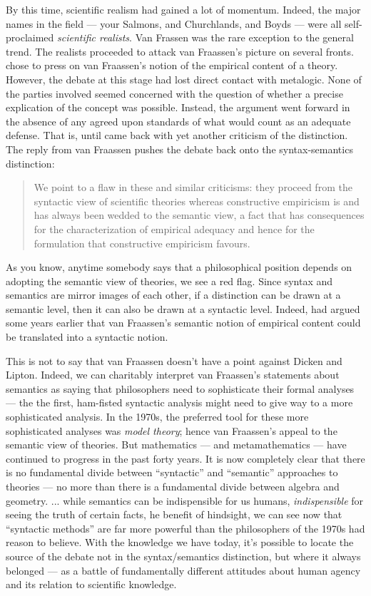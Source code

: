 By this time, scientific realism had gained a lot of momentum.
Indeed, the major names in the field --- your Salmons, and
Churchlands, and Boyds --- were all self-proclaimed {\it scientific
  realists}.  Van Frassen was the rare exception to the general trend.
The realists proceeded to attack van Fraassen's picture on several
fronts.  \cite{musgrave} chose to press on van Fraassen's notion of
the empirical content of a theory.  However, the debate at this stage
had lost direct contact with metalogic.  None of the parties involved
seemed concerned with the question of whether a precise explication of
the concept was possible.  Instead, the argument went forward in the
absence of any agreed upon standards of what would count as an
adequate defense.  That is, until \cite{dick} came back with yet
another criticism of the distinction.  The reply from van Fraassen
pushes the debate back onto the syntax-semantics distinction:
\begin{quote}
  We point to a flaw in these and similar criticisms: they proceed
  from the syntactic view of scientific theories whereas constructive
  empiricism is and has always been wedded to the semantic view, a
  fact that has consequences for the characterization of empirical
  adequacy and hence for the formulation that constructive empiricism
  favours. \citep{muller} \end{quote} As you know, anytime somebody
says that a philosophical position depends on adopting the semantic
view of theories, we see a red flag.  Since syntax and semantics are
mirror images of each other, if a distinction can be drawn at a
semantic level, then it can also be drawn at a syntactic level.
Indeed, \cite{turney} had argued some years earlier that van
Fraassen's semantic notion of empirical content could be translated
into a syntactic notion.

This is not to say that van Fraassen doesn't have a point against
Dicken and Lipton.  Indeed, we can charitably interpret van Fraassen's
statements about semantics as saying that philosophers need to
sophisticate their formal analyses --- the the first, ham-fisted
syntactic analysis might need to give way to a more sophisticated
analysis.  In the 1970s, the preferred tool for these more
sophisticated analyses was {\it model theory}; hence van Fraassen's
appeal to the semantic view of theories.  But mathematics --- and
metamathematics --- have continued to progress in the past forty
years.  It is now completely clear that there is no fundamental divide
between ``syntactic'' and ``semantic'' approaches to theories --- no
more than there is a fundamental divide between algebra and geometry.
... while semantics can be indispensible for us humans, {\it
  indispensible} for seeing the truth of certain facts, he benefit of
hindsight, we can see now that ``syntactic methods'' are far more
powerful than the philosophers of the 1970s had reason to believe.
With the knowledge we have today, it's possible to locate the source
of the debate not in the syntax/semantics distinction, but where it
always belonged --- as a battle of fundamentally different attitudes
about human agency and its relation to scientific knowledge.


